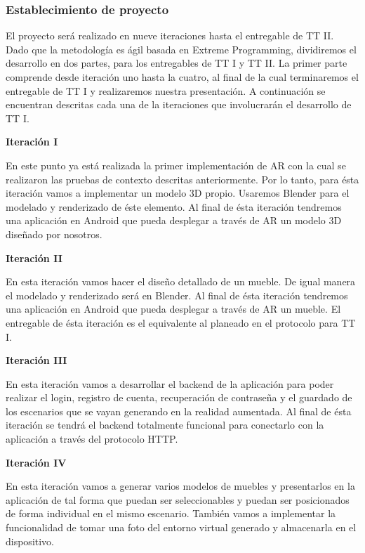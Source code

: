 \subsubsection{Establecimiento de proyecto}
El proyecto será realizado en nueve iteraciones hasta el entregable de TT II. Dado que la metodología es ágil basada en Extreme Programming, dividiremos el desarrollo en dos partes, para los entregables de TT I y TT II. La primer parte comprende desde iteración uno hasta la cuatro, al final de la cual terminaremos el entregable de TT I y realizaremos nuestra presentación. A continuación se encuentran descritas cada una de la iteraciones que involucrarán el desarrollo de TT I.\par

\textbf{Iteración I} \par
En este punto ya está realizada la primer implementación de AR con la cual se realizaron las pruebas de contexto descritas anteriormente. Por lo tanto, para ésta iteración vamos a implementar un modelo 3D propio. Usaremos Blender para el modelado y renderizado de éste elemento. Al final de ésta iteración tendremos una aplicación en Android que pueda desplegar a través de AR un modelo 3D diseñado por nosotros.

\textbf{Iteración II} \par
En esta iteración vamos hacer el diseño detallado de un mueble. De igual manera el modelado y renderizado será en Blender. Al final de ésta iteración tendremos una aplicación en Android que pueda desplegar a través de AR un mueble. El entregable de ésta iteración es el equivalente al planeado en el protocolo para TT I.

\textbf{Iteración III} \par
En esta iteración vamos a desarrollar el backend de la aplicación para poder realizar el login, registro de cuenta, recuperación de contraseña y el guardado de los escenarios que se vayan generando en la realidad aumentada. Al final de ésta iteración se tendrá el backend totalmente funcional para conectarlo con la aplicación a través del protocolo HTTP.

\textbf{Iteración IV} \par
En esta iteración vamos a generar varios modelos de muebles y presentarlos en la aplicación de tal forma que puedan ser seleccionables y puedan ser posicionados de forma individual en el mismo escenario. También vamos a implementar la funcionalidad de tomar una foto del entorno virtual generado y almacenarla en el dispositivo.

